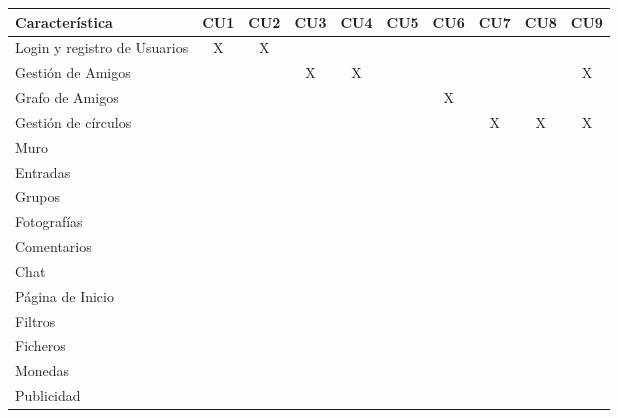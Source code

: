 \documentclass[12pt, a4paper, titlepage]{article}
\begin{document}
\begin{center}

\begin{tabular}{|p{3cm}|c|c|c|c|c|c|c|c|c|}
\hline 
\textbf{Característica} & CU1 & CU2  & CU3 & CU4 & CU5 & CU6 & CU7 & CU8 & CU9 \\ 
\hline 
Login y registro de Usuarios& X & X  &   &   &   &   &   &   &   \\ 
\hline 
Gestión de Amigos &   &    &  X &  X  &   &   &   &   &  X \\ 
\hline 
Grafo de Amigos&   &    &   &   &   & X  &   &   &   \\ 
\hline 
Gestión de círculos&   &    &   &   &   &   &  X & X  &  X \\ 
\hline 
Muro&   &    &   &   &   &   &   &   &   \\ 
\hline 
Entradas&   &    &   &   &   &   &   &   &   \\ 
\hline 
Grupos &   &    &   &   &   &   &   &   &   \\ 
\hline 
Fotografías &   &    &   &   &   &   &   &   &   \\ 
\hline 
Comentarios &   &    &   &   &   &   &   &   &   \\ 
\hline 
Chat&   &    &   &   &   &   &   &   &   \\ 
\hline 
Página de Inicio &   &    &   &   &   &   &   &   &   \\ 
\hline 
Filtros &   &    &   &   &   &   &   &   &   \\ 
\hline 
Ficheros &   &    &   &   &   &   &   &   &   \\  
\hline 
Monedas &   &    &   &   &   &   &   &   &   \\ 
\hline 
Publicidad &   &    &   &   &   &   &   &   &   \\ 
\hline  
\end{tabular} 
\end{center}
\end{document}
